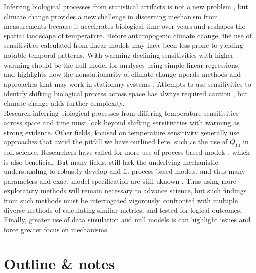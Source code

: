 \documentclass[11pt,letter]{article}
\begin{document}
Inferring biological processes from statistical artifacts is not a new problem \citep[e.g.,][]{nee2005}, but climate change provides a new challenge in discerning mechanism from measurements because it accelerates biological time over years and reshapes the spatial landscape of temperature. Before anthropogenic climate change, the use of sensitivities calculated from linear models may have been less prone to yielding notable temporal patterns. With warming declining sensitivities with higher warming should be the null model for analyses using simple linear regressions, and highlights how the nonstationarity of climate change upends methods and approaches that may work in stationary systems \citep{Milly:2008yu,tempeco}.  Attempts to use sensitivities to identify shifting biological process across space has always required caution \citep[e.g.,][]{Phillimore2012,tansey2017}, but climate change adds further complexity. \\

Research inferring biological processes from differing temperature sensitivities across space and time must look beyond shifting sensitivities with warming as strong evidence. Other fields, focused on temperature sensitivity generally use approaches that avoid the pitfall we have outlined here, such as the use of $Q_{10}$ in soil science. Researchers have called for more use of process-based models \citep{keenan2019}, which is also beneficial. But many fields, still lack the underlying mechanistic understanding to robustly develop and fit process-based models, and thus many parameters and exact model specification are still uknown \citep{chuine2016}. Thus using more exploratory methods will remain necessary to advance science, but such findings from such methods must be interrogated vigorously, confronted with multiple diverse methods of calculating similar metrics, and tested for logical outcomes. Finally, greater use of data simulation and null models is can highlight issues and force greater focus on mechanisms. 




\section{Outline \& notes}
\end{document}
